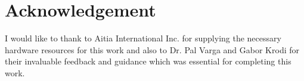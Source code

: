 \documentclass[conference]{IEEEtran}
\begin{document}
\section{Acknowledgement}
I would like to thank to Aitia International Inc. for supplying the necessary hardware resources for this work and also to Dr. Pal Varga and Gabor Krodi for their invaluable feedback and guidance which was essential for completing this work.





%

%
%
\end{document}
